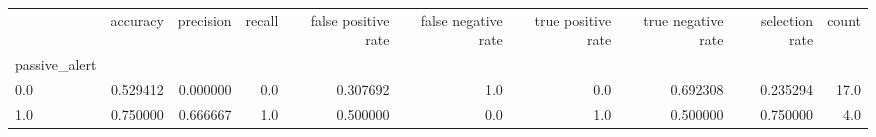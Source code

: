 \begin{tabular}{lrrrrrrrrr}
\toprule
{} &  accuracy &  precision &  recall &  false positive rate &  false negative rate &  true positive rate &  true negative rate &  selection rate &  count \\
passive\_alert &           &            &         &                      &                      &                     &                     &                 &        \\
\midrule
0.0           &  0.529412 &   0.000000 &     0.0 &             0.307692 &                  1.0 &                 0.0 &            0.692308 &        0.235294 &   17.0 \\
1.0           &  0.750000 &   0.666667 &     1.0 &             0.500000 &                  0.0 &                 1.0 &            0.500000 &        0.750000 &    4.0 \\
\bottomrule
\end{tabular}
